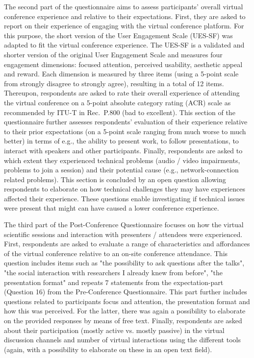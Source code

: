 \documentclass[sigconf]{acmart}
\newcommand{\afblock}[1]{\noindent{\textbf{#1 }}}
\begin{document}
\afblock{Overall Experience.}
The second part of the questionnaire aims to assess participants' overall virtual conference experience and relative to their expectations.
First, they are asked to report on their experience of engaging with the virtual conference platform.
For this purpose, the short version of the User Engagement Scale (UES-SF)\cite{o2018practical} was adapted to fit the virtual conference experience.
The UES-SF is a validated and shorter version of the original User Engagement Scale and measures four engagement dimensions: focused attention, perceived usability, aesthetic appeal and reward. Each dimension is measured by three items (using a 5-point scale from strongly disagree to strongly agree), resulting in a total of 12 items. 
Thereupon, respondents are asked to rate their overall experience of attending the virtual conference on a 5-point absolute category rating (ACR) scale as recommended by ITU-T in Rec.\ P.800 (bad to excellent).
This section of the questionnaire further assesses respondents' evaluation of their experience relative to their prior expectations (on a 5-point scale ranging from much worse to much better) in terms of e.g., the ability to present work, to follow presentations, to interact with speakers and other participants.
Finally, respondents are asked to which extent they experienced technical problems (audio / video impairments, problems to join a session) and their potential cause (e.g., network-connection related problems).
This section is concluded by an open question allowing respondents to elaborate on how technical challenges they may have experiences affected their experience.
These questions enable investigating if technical issues were present that might can have caused a lower conference experience.

\afblock{Technical Session Experience.}
The third part of the Post-Conference Questionnaire focuses on how the virtual scientific sessions and interaction with presenters / attendees were experienced.
First, respondents are asked to evaluate a range of characteristics and affordances of the virtual conference relative to an on-site conference attendance.
This question includes items such as "the possibility to ask questions after the talks", "the social interaction with researchers I already knew from before", "the presentation format" and repeats 7 statements from the expectation-part (Question 16) from the Pre-Conference Questionnaire. 
This part further includes questions related to participants focus and attention, the presentation format and how this was perceived.
For the latter, there was again a possibility to elaborate on the provided responses by means of free text.
Finally, respondents are asked about their participation (mostly active vs. mostly passive) in the virtual discussion channels and number of virtual interactions using the different tools (again, with a possibility to elaborate on these in an open text field).
\end{document}
